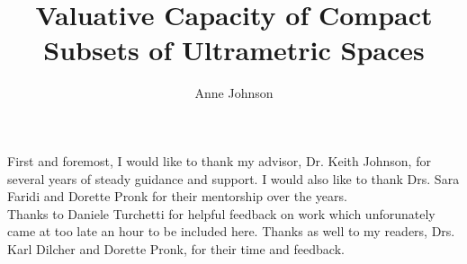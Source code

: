 \documentclass[12pt, glossary]{dalthesis}
\theoremstyle{plain}
\theoremstyle{definition}
\begin{document}
\title{Valuative Capacity of Compact Subsets of Ultrametric Spaces}
\author{Anne Johnson}

\mcs





\nolistoftables
\nolistoffigures

\frontmatter


\begin{abstract}

\end{abstract}

\printglossary

\begin{acknowledgements}
  First and foremost, I would like to thank my advisor, Dr. Keith Johnson, for several years of steady guidance and support. I would also like to thank Drs. Sara Faridi and Dorette Pronk for their mentorship over the years.\\
  
 Thanks to Daniele Turchetti for helpful feedback on work which unforunately came at too late an hour to be included here. Thanks as well to my readers, Drs. Karl Dilcher and Dorette Pronk, for their time and feedback.\\
 

 
\end{acknowledgements}

\mainmatter
\end{document}
